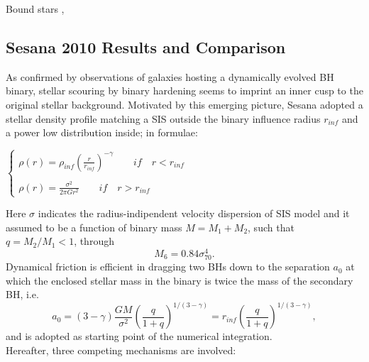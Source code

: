Bound stars \cite{Sesana_2008}     ,\cite{Sesana_2010}
\newpage
\subsection{Sesana 2010 Results and  Comparison}
As confirmed by observations of galaxies hosting a dynamically evolved BH binary, stellar scouring by binary hardening seems to imprint an inner cusp to the original stellar background. Motivated by this emerging picture, Sesana \cite{Sesana_2010} adopted a stellar density profile matching a SIS outside the binary influence radius $r_{inf}$ and a power low distribution inside; in formulae:
\begin{flushleft}\label{Sesana_2010 stellar cusp profile}
  $
  \left\{
  \begin{aligned}
  \rho(r)=\rho_{inf}\left(\frac{r}{r_{inf}}\right)^{-\gamma} \qquad if \quad r<r_{inf}\\
  \\ \rho(r)=\frac{\sigma^2}{2\pi G r^2} \qquad if \quad r>r_{inf}
  \end{aligned}
  \right.
  $
  \end{flushleft}
Here $\sigma$ indicates the radius-indipendent velocity dispersion of SIS model and it assumed to be a function of binary mass $M=M_1+M_2$, such that $q=M_2/M_1<1$, through \cite{Tremaine_2002}
\begin{equation}\label{Tremaine_2002 M_bh}
    M_6=0.84\sigma_{70}^4.
\end{equation}
Dynamical friction is efficient in dragging two BHs down to the separation $a_0$ at which the enclosed stellar mass
in the binary is twice the mass of the secondary BH, i.e.  
\begin{equation}\label{Sesana_2010 a_0}
    a_0=(3-\gamma)\frac{GM}{\sigma^2}\left(\frac{q}{1+q}\right)^{1/(3-\gamma)}=r_{inf}\left(\frac{q}{1+q}\right)^{1/(3-\gamma)},
\end{equation}
and is adopted as starting point of the numerical integration.\\Hereafter, three competing mechanisms are involved:
